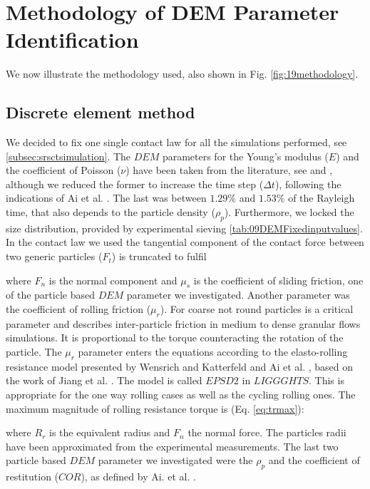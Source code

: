 \section{Methodology of DEM Parameter Identification}
\label{sec:methodology}

We now illustrate the methodology used, also shown in Fig.
\ref{fig:19methodology}.



\subsection{Discrete element method}
\label{subsec:dem}

We decided to fix one single
contact law for all the simulations performed, see
\ref{subsec:srsctsimulation}.
The $DEM$ parameters for the Young's modulus ($E$) and the coefficient of Poisson ($\nu$) 
have been taken from the literature, see \cite{RefWorks:175} and \cite{RefWorks:176}, 
although we reduced the former to increase the time step ($\Delta t$), following
the indications of Ai et al. \cite{RefWorks:131}.
The last was between $1.29 \%$ and $1.53 \%$ of the Rayleigh time, that also
depends to the particle density ($\rho_p$).
Furthermore, we locked the size distribution, provided by experimental sieving
\ref{tab:09DEMFixedinputvalues}.
In the contact law we used 
the tangential component of the contact force between two generic particles
($F_t$) is truncated to fulfil

where $F_n$ is the normal component and $\mu_s$ is the coefficient of sliding
friction, one of the particle based $DEM$ parameter we investigated. 
Another parameter was the coefficient of rolling friction ($\mu_r$). 
For coarse not round particles is a critical parameter and describes inter-particle 
friction in medium to dense granular flows simulations. It is proportional to the 
torque counteracting the rotation of the particle. The $\mu_r$ parameter enters the 
equations according to the elasto-rolling resistance model presented by Wensrich and 
Katterfeld \cite{RefWorks:87} and Ai et al. \cite{RefWorks:131}, 
based on the work of Jiang et al. \cite{RefWorks:143}. 
The model is called $EPSD2$ in $LIGGGHTS$. This is appropriate for the one way
rolling cases as well as the cycling rolling ones.
The maximum magnitude of rolling resistance torque is (Eq. \ref{eq:trmax}):

where $R_r$ is the equivalent radius and $F_n$ the normal force.
The particles radii have been approximated from the experimental measurements. 
The last two particle based $DEM$ parameter we investigated were the $\rho_p$
and the coefficient of restitution ($COR$), as defined by Ai. et al. \cite{RefWorks:131}.

